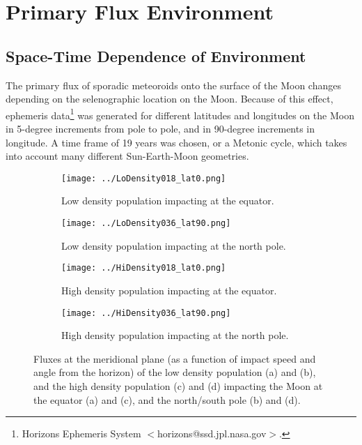 \documentclass{article}
\begin{document}
\section{Primary Flux Environment}



\subsection{Space-Time Dependence of Environment}


The primary flux of sporadic meteoroids onto the surface of the Moon changes depending on the selenographic location on the Moon. Because of this effect, ephemeris data\footnote{Horizons Ephemeris System $<$horizons@ssd.jpl.nasa.gov$>$.} was generated for different latitudes and longitudes on the Moon in 5-degree increments from pole to pole, and in 90-degree increments in longitude. A time frame of 19 years was chosen, or a Metonic cycle, which takes into account many different Sun-Earth-Moon geometries.

\begin{figure}[h!]
	\begin{subfigure}{.485\textwidth}
		\centering
		\texttt{[image: ../LoDensity018\_lat0.png]}  
		\caption{Low density population impacting at the equator.}
		\label{fig:sub-LoDensity018_lat0}
	\end{subfigure}
	\begin{subfigure}{.485\textwidth}
		\centering
		\texttt{[image: ../LoDensity036\_lat90.png]}  
		\caption{Low density population impacting at the north pole.}
		\label{fig:sub-LoDensity036_lat90}
	\end{subfigure}
	\newline
	\begin{subfigure}{.485\textwidth}
		\centering
		\texttt{[image: ../HiDensity018\_lat0.png]}  
		\caption{High density population impacting at the equator.}
		\label{fig:sub-HiDensity018_lat0}
	\end{subfigure}
	\begin{subfigure}{.485\textwidth}
		\centering
		\texttt{[image: ../HiDensity036\_lat90.png]}  
		\caption{High density population impacting at the north pole.}
		\label{fig:sub-HiDensity036_lat90}
	\end{subfigure}
	\caption{Fluxes at the meridional plane (as a function of impact speed and angle from the horizon) of the low density population (a) and (b), and the high density population (c) and (d) impacting the Moon at the equator (a) and (c), and the north/south pole (b) and (d).}
	\label{fig:latitudinal_dependence}
\end{figure}
\end{document}
